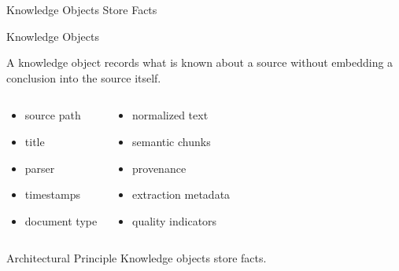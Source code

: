 \documentclass[aspectratio=169]{beamer}
\begin{document}

\begin{frame}{Knowledge Objects Store Facts}

\Large

\begin{block}{Knowledge Objects}

A knowledge object records what is known about a source without embedding
a conclusion into the source itself.

\end{block}

\vspace{0.05cm}

\small

\begin{columns}[T]


\begin{block}

\begin{itemize}
\item source path
\item title
\item parser
\item timestamps
\item document type
\end{itemize}

\end{block}


\begin{block}

\begin{itemize}
\item normalized text
\item semantic chunks
\item provenance
\item extraction metadata
\item quality indicators
\end{itemize}

\end{block}

\end{columns}

\vspace{0.05cm}

\begin{alertblock}{Architectural Principle}
Knowledge objects store facts.
\end{alertblock}

\end{frame}
\end{document}
